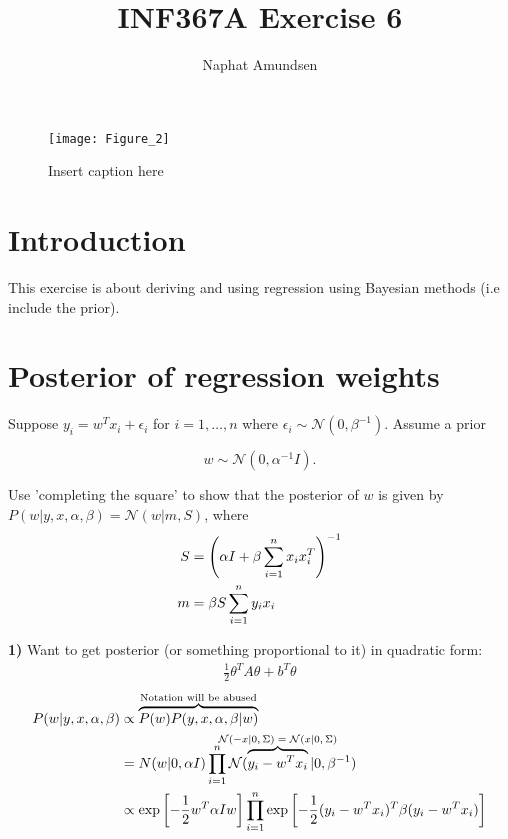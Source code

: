 \documentclass[12pt]{article}
\begin{document}
\title{\textbf{INF367A Exercise 6}}
\author{Naphat Amundsen}
\maketitle
\sectionfont{\fontsize{14}{15}\selectfont}
\subsectionfont{\fontsize{12}{15}\selectfont}
\subsubsectionfont{\fontsize{12}{15}\selectfont}
\graphicspath{ {./images/} }

\ifx
\begin{figure}[H]
	\centering
	\texttt{[image: Figure\_2]}
	\caption{Insert caption here}
\end{figure}
\fi



\section*{Introduction}
This exercise is about deriving and using regression using Bayesian methods (i.e include the prior).

\section{Posterior of regression weights}
\begin{tcolorbox}
    Suppose $y_i = w^T x_i + \epsilon_i$ for  $i = 1, \ldots, n$ where $\epsilon_i \sim \mathcal{N}(0, \beta^{-1})$. Assume a prior 

    $$w \sim \mathcal{N}(0, \alpha^{-1}I).$$
    
    Use 'completing the square' to show that the posterior of $w$ is given by $P(w|y,x,\alpha,\beta)=\mathcal{N}(w|m,S)$, where 
    \begin{align*}
        S &= \left( \alpha I + \beta \sum\limits_{i=1}^{n} x_i x_i^T \right)^{-1} \\ 
        m &= \beta S \sum\limits_{i=1}^{n} y_i x_i
    \end{align*}    
\end{tcolorbox}
\newcommand{\mvnexpol}[2]{\exp \left[  -{\frac{1}{2}} #1^T #2 #1 \right]}

\textbf{1)} Want to get posterior (or something proportional to it) in quadratic form:
\begin{align}
    \frac{1}{2} \theta^T A \theta + b^T \theta
\end{align}
\begin{align}
    P(w|y, x, \alpha, \beta) &\propto \overtext{P(w) P(y, x, \alpha, \beta|w)}{Notation will be abused} \\
    &= N(w|0,\alpha I) \prodlim{1}{n} \mathcal{N}(\overtext{y_i - w^T x_i}{$\mathcal{N}(-x|0, \Sigma) = \mathcal{N}(x|0, \Sigma)$} |0, \beta^{-1}) \\
    &\propto \mvnexpol{w}{\alpha I} \prodlim{1}{n} \mvnexpol{(y_i - w^T x_i)}{\beta}
\end{align}
\end{document}
